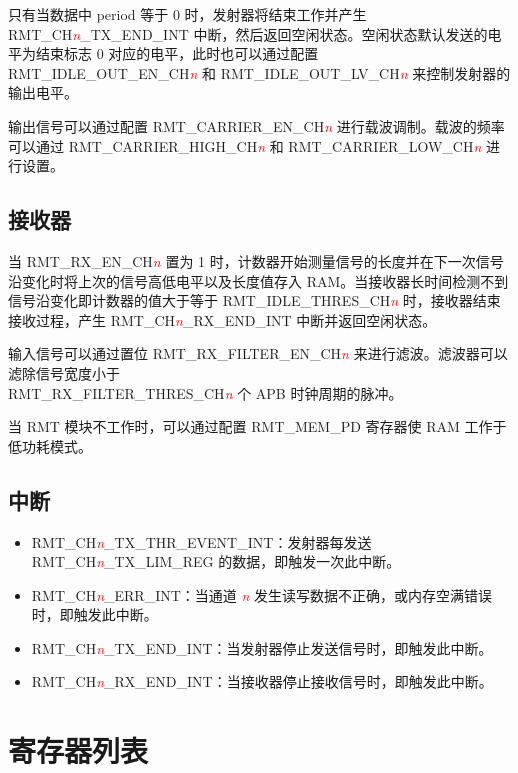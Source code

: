 \documentclass[main\_\_CN.tex]{subfiles}
\begin{document}
只有当数据中 period 等于 0 时，发射器将结束工作并产生 RMT\_CH\textcolor{red}{\it{n}}\_TX\_END\_INT 中断，然后返回空闲状态。空闲状态默认发送的电平为结束标志 0 对应的电平，此时也可以通过配置 RMT\_IDLE\_OUT\_EN\_CH\textcolor{red}{\it{n}} 和 RMT\_IDLE\_OUT\_LV\_CH\textcolor{red}{\it{n}} 来控制发射器的输出电平。

输出信号可以通过配置 RMT\_CARRIER\_EN\_CH\textcolor{red}{\it{n}} 进行载波调制。载波的频率可以通过 RMT\_CARRIER\_HIGH\_CH\textcolor{red}{\it{n}} 和 RMT\_CARRIER\_LOW\_CH\textcolor{red}{\it{n}} 进行设置。

\subsection{接收器}
当 RMT\_RX\_EN\_CH\textcolor{red}{\it{n}} 置为 1 时，计数器开始测量信号的长度并在下一次信号沿变化时将上次的信号高低电平以及长度值存入 RAM。当接收器长时间检测不到信号沿变化即计数器的值大于等于 RMT\_IDLE\_THRES\_CH\textcolor{red}{\it{n}} 时，接收器结束接收过程，产生 RMT\_CH\textcolor{red}{\it{n}}\_RX\_END\_INT 中断并返回空闲状态。

输入信号可以通过置位 RMT\_RX\_FILTER\_EN\_CH\textcolor{red}{\it{n}} 来进行滤波。滤波器可以滤除信号宽度小于\\ RMT\_RX\_FILTER\_THRES\_CH\textcolor{red}{\it{n}} 个 APB 时钟周期的脉冲。

当 RMT 模块不工作时，可以通过配置 RMT\_MEM\_PD 寄存器使 RAM 工作于低功耗模式。
\subsection{中断}
\begin{itemize}
\item \label{int:RMTCHnTXTHREVENTINT}RMT\_CH\textcolor{red}{\it{n}}\_TX\_THR\_EVENT\_INT：发射器每发送 RMT\_CH\textcolor{red}{\it{n}}\_TX\_LIM\_REG 的数据，即触发一次此中断。
\item \label{int:RMTCHnERRINT}RMT\_CH\textcolor{red}{\it{n}}\_ERR\_INT：当通道 \textcolor{red}{\it{n}} 发生读写数据不正确，或内存空满错误时，即触发此中断。
\item \label{int:RMTCHnTXENDINT}RMT\_CH\textcolor{red}{\it{n}}\_TX\_END\_INT：当发射器停止发送信号时，即触发此中断。
\item \label{int:RMTCHnRXENDINT}RMT\_CH\textcolor{red}{\it{n}}\_RX\_END\_INT：当接收器停止接收信号时，即触发此中断。
\end{itemize}

\hypertarget{rmt-reg-summ}{}
\section{寄存器列表}\label{sec:rmt-reg-summ}
\end{document}
